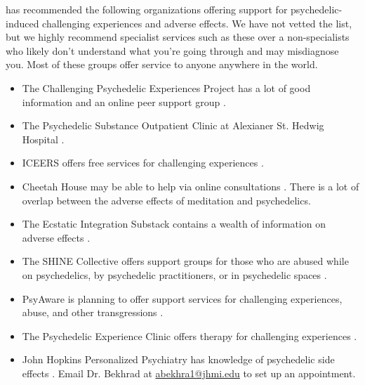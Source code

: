 \documentclass[12pt,letterpaper]{book}
\begin{document}
\textcite{supportNetwork} has recommended the following organizations offering support for psychedelic-induced challenging experiences and adverse effects. We have not vetted the list, but we highly recommend specialist services such as these over a non-specialists who likely don't understand what you're going through and may misdiagnose you. Most of these groups offer service to anyone anywhere in the world.
\begin{itemize}
	\item The Challenging Psychedelic Experiences Project has a lot of good information and an online peer support group \cite{peersupportgroup}.
	\item The Psychedelic Substance Outpatient Clinic at Alexianer St. Hedwig Hospital \cite{alexianerClinic}.
	\item ICEERS offers free services for challenging experiences \cite{iceers}.
	\item Cheetah House may be able to help via online consultations \cite{cheetahHouse}. There is a lot of overlap between the adverse effects of meditation and psychedelics.
	\item The Ecstatic Integration Substack contains a wealth of information on adverse effects \cite{ecstaticIntegration}.
	\item The SHINE Collective offers support groups for those who are abused while on psychedelics, by psychedelic practitioners, or in psychedelic spaces \cite{shineCollective}.
	\item PsyAware is planning to offer support services for challenging experiences, abuse, and other transgressions \cite{psyaware}.
	\item The Psychedelic Experience Clinic offers therapy for challenging experiences \cite{rabbitClinic}.
	\item John Hopkins Personalized Psychiatry has knowledge of psychedelic side effects \cite{hopkinsPersonalized}. Email Dr. Bekhrad at \href{mailto:abekhra1@jhmi.edu}{abekhra1@jhmi.edu} to set up an appointment.
\end{itemize}
\end{document}
